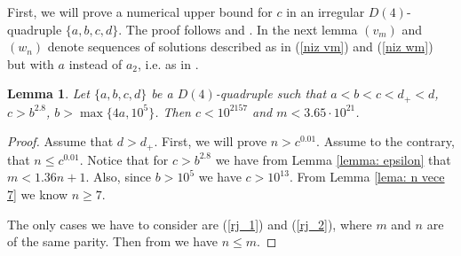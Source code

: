 \documentclass[12pt]{amsart}%
\newtheorem{lemma}[theorem]{Lemma}
\theoremstyle{definition}
\theoremstyle{remark}
\theoremstyle{plain}
\begin{document}
First, we will prove a numerical upper bound for $c$ in an irregular $D(4)$-quadruple $\{a,b,c,d\}$. The proof follows \cite[Proposition 4]{duje_kon} and \cite[Lemma 13]{fil_xy4}. In the next lemma $(v_m)$ and $(w_n)$ denote sequences of solutions described as in (\ref{niz vm}) and (\ref{niz wm}) but with $a$ instead of $a_2$, i.e. as in \cite{mbt}. 
\begin{lemma}\label{lema: nume_c}
    Let $\{a,b,c,d\}$ be a $D(4)$-quadruple such that $a<b<c<d_+<d$,  $c>b^{2.8}$, $b>\max\{4a,10^5\}$. Then $c<10^{2157}$ and $m<3.65\cdot 10^{21}$.
\end{lemma}
\begin{proof}
Assume that $d>d_+$.    First, we will prove $n>c^{0.01}$.
    Assume to the contrary, that $n\leq c^{0.01}$.  Notice that for $c>b^{2.8}$ we have from Lemma \ref{lemma: epsilon} that $m<1.36n+1$. Also, since $b>10^5$ we have $c>10^{13}$. From Lemma \ref{lema: n vece 7} we know $n\geq 7$. 

    The only cases we have to consider are (\ref{rj_1}) and (\ref{rj_2}), where $m$ and $n$ are of the same parity. Then  from \cite[Lemma 5]{fil_xy4} we have $n\leq m$.
    

\end{proof}
\end{document}
